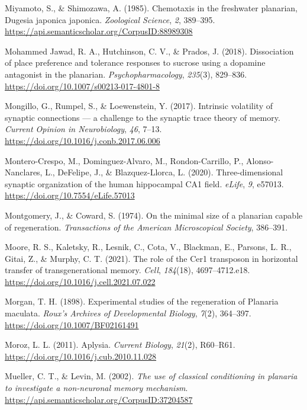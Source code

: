 \documentclass[
  jou,
  floatsintext,
  longtable,
  nolmodern,
  notxfonts,
  notimes,
  donotrepeattitle,
  colorlinks=true,linkcolor=blue,citecolor=blue,urlcolor=blue]{apa7}
\newlength{\cslhangindent}
\newenvironment{CSLReferences}[2] %
 {\begin{list}{}{%
  \setlength{\itemindent}{0pt}
  \setlength{\leftmargin}{0pt}
  \setlength{\parsep}{0pt}
  \ifodd #1
   \setlength{\leftmargin}{\cslhangindent}
   \setlength{\itemindent}{-1\cslhangindent}
  \fi
  \setlength{\itemsep}{#2\baselineskip}}}
 {\end{list}}
\begin{document}
\begin{CSLReferences}{1}{0}
Miyamoto, S., \& Shimozawa, A. (1985). Chemotaxis in the freshwater
planarian, {Dugesia} japonica japonica. \emph{Zoological Science},
\emph{2}, 389--395.
\url{https://api.semanticscholar.org/CorpusID:88989308}

Mohammed Jawad, R. A., Hutchinson, C. V., \& Prados, J. (2018).
Dissociation of place preference and tolerance responses to sucrose
using a dopamine antagonist in the planarian. \emph{Psychopharmacology},
\emph{235}(3), 829--836. \url{https://doi.org/10.1007/s00213-017-4801-8}

Mongillo, G., Rumpel, S., \& Loewenstein, Y. (2017). Intrinsic
volatility of synaptic connections --- a challenge to the synaptic trace
theory of memory. \emph{Current Opinion in Neurobiology}, \emph{46},
7--13. \url{https://doi.org/10.1016/j.conb.2017.06.006}

Montero-Crespo, M., Dominguez-Alvaro, M., Rondon-Carrillo, P.,
Alonso-Nanclares, L., DeFelipe, J., \& Blazquez-Llorca, L. (2020).
Three-dimensional synaptic organization of the human hippocampal {CA1}
field. \emph{eLife}, \emph{9}, e57013.
\url{https://doi.org/10.7554/eLife.57013}

Montgomery, J., \& Coward, S. (1974). On the minimal size of a planarian
capable of regeneration. \emph{Transactions of the American
Microscopical Society}, 386--391.

Moore, R. S., Kaletsky, R., Lesnik, C., Cota, V., Blackman, E., Parsons,
L. R., Gitai, Z., \& Murphy, C. T. (2021). The role of the {Cer1}
transposon in horizontal transfer of transgenerational memory.
\emph{Cell}, \emph{184}(18), 4697--4712.e18.
\url{https://doi.org/10.1016/j.cell.2021.07.022}

Morgan, T. H. (1898). Experimental studies of the regeneration of
{Planaria} maculata. \emph{Roux's Archives of Developmental Biology},
\emph{7}(2), 364--397. \url{https://doi.org/10.1007/BF02161491}

Moroz, L. L. (2011). Aplysia. \emph{Current Biology}, \emph{21}(2),
R60--R61. \url{https://doi.org/10.1016/j.cub.2010.11.028}

Mueller, C. T., \& Levin, M. (2002). \emph{The use of classical
conditioning in planaria to investigate a non-neuronal memory
mechanism}. \url{https://api.semanticscholar.org/CorpusID:37204587}


\end{CSLReferences}
\end{document}
